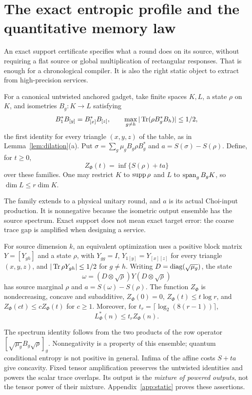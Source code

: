 \section{The exact entropic profile and the quantitative memory law}\label{sec:entropic}

An exact support certificate specifies what a round does on its source, without requiring a flat source or
global multiplication of rectangular responses. That is enough for a chronological compiler. It is also the
right static object to extract from high-precision services.

\begin{definition}\label{def:exact-profile}
For a canonical untwisted anchored gadget, take finite spaces $K,L$, a state $\rho$ on $K$, and isometries
$B_g:K\to L$ satisfying
\[
 B_1^*B_{[y]}=B_{[x]}^*B_{[z]},\qquad
 \max_{g\ne h}|\operatorname{Tr}(\rho B_g^*B_h)|\le1/2,
\]
the first identity for every triangle $(x,y,z)$ of the table, as in Lemma~\ref{lem:dilation}(a).
Put $\sigma=\sum_g\mu_g B_g\rho B_g^*$ and $a=S(\sigma)-S(\rho)$. Define, for $t\ge0$,
\[
 Z_\Phi(t)=\inf\{S(\rho)+t a\}
\]
over these families. One may restrict $K$ to $\operatorname{supp}\rho$ and $L$ to $\operatorname{span}_g B_gK$, so $\dim L\le r\dim K$.
\end{definition}

The family extends to a physical unitary round, and $a$ is its actual Choi-input production.
It is nonnegative because the isometric output ensemble has the source spectrum. Exact support does not mean
exact target error: the coarse trace gap is amplified when designing a service.

\begin{proposition}\label{prop:Z-matrix}
For source dimension $k$, an equivalent optimization uses a positive block matrix $Y=[Y_{gh}]$ and a state $\rho$,
with $Y_{gg}=I$, $Y_{1[y]}=Y_{[x][z]}$ for every triangle $(x,y,z)$, and $|\operatorname{Tr}\rho Y_{gh}|\le1/2$ for $g\ne h$.
Writing $D=\operatorname{diag}(\sqrt{\mu_g})$, the state
\[
 \omega=(D\otimes\sqrt\rho)Y(D\otimes\sqrt\rho)
\]
has source marginal $\rho$ and $a=S(\omega)-S(\rho)$. The function $Z_\Phi$ is nondecreasing, concave and subadditive,
$Z_\Phi(0)=0$, $Z_\Phi(t)\le t\log r$, and $Z_\Phi(ct)\le cZ_\Phi(t)$ for $c\ge1$.
Moreover, for $t_r=\lceil\log_2(8(r-1))\rceil$,
\[
 L^*_\Phi(n)\le t_r Z_\Phi(n).
\]
\end{proposition}

The spectrum identity follows from the two products of the row operator
$[\sqrt{\mu_g}B_g\sqrt\rho]_g$. Nonnegativity is a property of this ensemble; quantum conditional entropy is
not positive in general. Infima of the affine costs $S+t a$ give concavity. Fixed tensor amplification preserves
the untwisted identities and powers the scalar trace overlaps. Its output is the \emph{mixture of powered outputs},
not the tensor power of their mixture. Appendix~\ref{app:static} proves these assertions.

